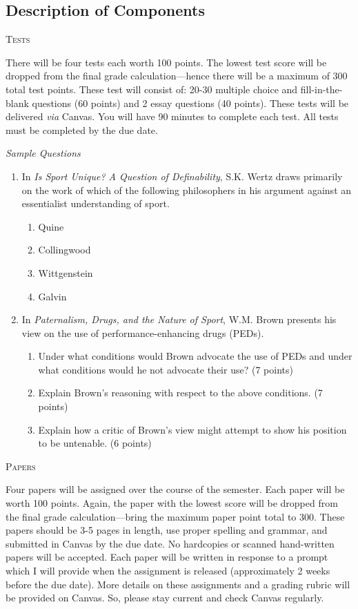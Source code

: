 \documentclass{tufte-handout}
\begin{document}
\begin{fullwidth}
\subsection{Description of Components}
\begin{center}
\textsc{Tests} \\
\end{center}
There will be four tests each worth 100 points. The lowest test score will be dropped from the final grade calculation---hence there will be a maximum of 300 total test points. These test will consist of: 20-30 multiple choice and fill-in-the-blank questions (60 points) and 2 essay questions (40 points). These tests will be delivered \textit{via} Canvas. You will have 90 minutes to complete each test. All tests must be completed by the due date.
\begin{center}
\textsl{Sample Questions}
\end{center}
\begin{enumerate}
	\item In \textit{Is Sport Unique? A Question of Definability}, S.K. Wertz draws primarily on the work of which of the following philosophers in his argument against an essentialist understanding of sport.
	\begin{enumerate}
		\item Quine
		\item Collingwood
		\item Wittgenstein
		\item Galvin
	\end{enumerate}
	\item In \textit{Paternalism, Drugs, and the Nature of Sport}, W.M. Brown presents his view on the use of performance-enhancing drugs (PEDs). 
	\begin{enumerate}
		\item Under what conditions would Brown advocate the use of PEDs and under what conditions would he not advocate their use? (7 points)
		\item Explain Brown's reasoning with respect to the above conditions. (7 points)
		\item Explain how a critic of Brown's view might attempt to show his position to be untenable. (6 points)
	\end{enumerate}
\end{enumerate}

\begin{center}
\textsc{Papers} \\
\end{center}
Four papers will be assigned over the course of the semester. Each paper will be worth 100 points. Again, the paper with the lowest score will be dropped from the final grade calculation---bring the maximum paper point total to 300. These papers should be 3-5 pages in length, use proper spelling and grammar, and submitted in Canvas by the due date. No hardcopies or scanned hand-written papers will be accepted. Each paper will be written in response to a prompt which I will provide when the assignment is released (approximately 2 weeks before the due date). More details on these assignments and a grading rubric will be provided on Canvas. So, please stay current and check Canvas regularly.


\end{fullwidth}
\end{document}
